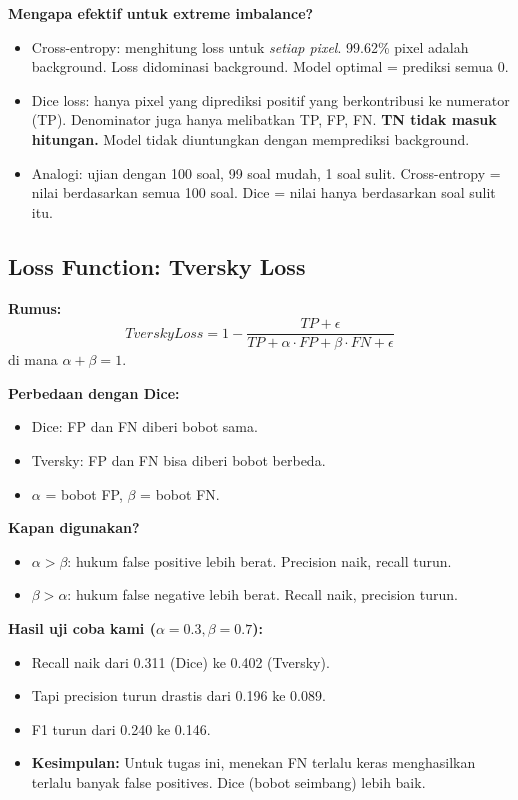 \documentclass[10pt,a4paper,onecolumn]{article}
\begin{document}
\textbf{Mengapa efektif untuk extreme imbalance?}
\begin{itemize}[nosep]
    \item Cross-entropy: menghitung loss untuk \textit{setiap pixel}.
          99.62\% pixel adalah background. Loss didominasi background.
          Model optimal = prediksi semua 0.
    \item Dice loss: hanya pixel yang diprediksi positif yang
          berkontribusi ke numerator (TP). Denominator juga hanya
          melibatkan TP, FP, FN. \textbf{TN tidak masuk hitungan.}
          Model tidak diuntungkan dengan memprediksi background.
    \item Analogi: ujian dengan 100 soal, 99 soal mudah, 1 soal
          sulit. Cross-entropy = nilai berdasarkan semua 100 soal.
          Dice = nilai hanya berdasarkan soal sulit itu.
\end{itemize}

\subsection{Loss Function: Tversky Loss}

\textbf{Rumus:}
$$TverskyLoss = 1 - \frac{TP + \epsilon}{TP + \alpha \cdot FP + \beta \cdot FN + \epsilon}$$
di mana $\alpha + \beta = 1$.

\textbf{Perbedaan dengan Dice:}
\begin{itemize}[nosep]
    \item Dice: FP dan FN diberi bobot sama.
    \item Tversky: FP dan FN bisa diberi bobot berbeda.
    \item $\alpha$ = bobot FP, $\beta$ = bobot FN.
\end{itemize}

\textbf{Kapan digunakan?}
\begin{itemize}[nosep]
    \item $\alpha > \beta$: hukum false positive lebih berat.
          Precision naik, recall turun.
    \item $\beta > \alpha$: hukum false negative lebih berat.
          Recall naik, precision turun.
\end{itemize}

\textbf{Hasil uji coba kami ($\alpha=0.3, \beta=0.7$):}
\begin{itemize}[nosep]
    \item Recall naik dari 0.311 (Dice) ke 0.402 (Tversky).
    \item Tapi precision turun drastis dari 0.196 ke 0.089.
    \item F1 turun dari 0.240 ke 0.146.
    \item \textbf{Kesimpulan:} Untuk tugas ini, menekan FN terlalu
          keras menghasilkan terlalu banyak false positives.
          Dice (bobot seimbang) lebih baik.
\end{itemize}
\end{document}
